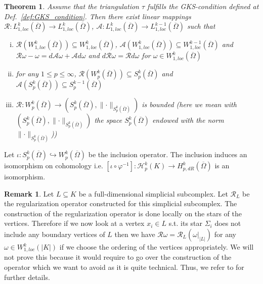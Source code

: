 \documentclass[12pt,a4paper]{article}
\numberwithin{equation}{subsection}
\numberwithin{lemma}{subsection}
\newtheorem{theorem}[lemma]{Theorem}
\theoremstyle{definition}
\newtheorem{remark}[lemma]{Remark}
\newcommand{\aop}{\mathscr{A}}
\newcommand{\lpcoho}{H^k_{p,dR}}
\newcommand{\norm}[2]{\lVert #1 \rVert_{#2}}
\newcommand{\omegabar}{\overline{\Omega}}
\newcommand{\rop}{\mathscr{R}} %
\begin{document}
\begin{theorem}\label{thm:operators}
    Assume that the triangulation $\tau$ fulfills the GKS-condition 
    defined at Def.~\ref{def:GKS_condition}.
    Then there exist linear mappings 
    $\mathscr{R}: L^k_{1,loc}(\omegabar) \rightarrow 
    L^k_{1,loc}(\omegabar)$, $\mathscr{A}: L^k_{1,loc}(\omegabar) 
    \rightarrow L^{k-1}_{1,loc}(\omegabar)$ 
    such that
    \begin{enumerate}[(i)]
        \item $\rop(W^k_{1,loc}(\omegabar)) \subseteq W^k_{1,loc}(\omegabar)$,
            $\aop(W^k_{1,loc}(\omegabar)) \subseteq W^{k-1}_{1,loc}(\omegabar)$
            and $\mathscr{R}\omega - \omega = 
            d\mathscr{A}\omega + \mathscr{A}d\omega$ and 
            $d\rop \omega  = \rop d \omega$ for 
            $\omega \in W^k_{1,loc}(\omegabar)$
        \item for any $1 \leq p \leq \infty$, 
            $\rop(W^k_p(\omegabar)) \subseteq S^k_p(\omegabar)$ and
            $\aop(S^k_p(\omegabar)) \subseteq S^{k-1}_p(\omegabar)$
        \item $\rop: W^k_p(\omegabar) \rightarrow 
            (S^k_p(\omegabar),\norm{\cdot}{S^k_p(\omegabar)})$ is bounded (here
            we mean with $(S^k_p(\omegabar),\norm{\cdot}{S^k_p(\omegabar)})$ 
            the space $S^k_p(\omegabar)$ endowed with the norm 
            $\norm{\cdot}{S^k_p(\omegabar)}$))
    \end{enumerate}
\end{theorem}

Let 
$\iota: S^k_p(\omegabar) \hookrightarrow W^k_p(\omegabar)$ be the inclusion operator. 
The inclusion induces an
isomorphism on cohomology \cite[Lemma 4, Corollary]{goldshtein} i.e. 
$[\iota \circ \varphi^{-1}]: \mathscr{H}_p^k(K) \rightarrow \lpcoho(\omegabar)$ is an isomorphism. 

\begin{remark}
    \color{red}
    Let $L \subseteq K$ be a full-dimensional %
    simplicial subcomplex. Let $\rop_L$ be the regularization operator 
    constructed for this simplicial subcomplex. The construction of the
    regularization operator is done locally on the stars of the vertices. %
    Therefore if we now look at a vertex $x_i \in L$ s.t. its star 
    $\Sigma_i$ does not include any boundary vertices of $L$ then we have 
    $\rop \omega = \rop_L(\omega|_{|L|})$ for any $\omega \in W^k_{1,loc}(|K|)$
    if we choose the ordering of the vertices appropriately.
    We will not prove this because it would require to go over the construction
    of the operator which we want to avoid as it is quite technical. Thus, 
    we refer to \cite[Sec.\,2]{goldshtein} for further details.
\end{remark}
\end{document}
